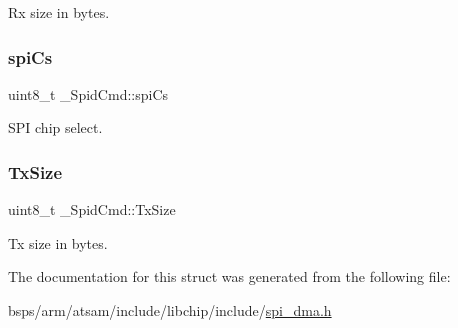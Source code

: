 Rx size in bytes. \mbox{\label{struct__SpidCmd_a25877429b448b90f258036306905bf7f}} 
\subsubsection{\texorpdfstring{spiCs}{spiCs}}
{\footnotesize\ttfamily uint8\+\_\+t \+\_\+\+Spid\+Cmd\+::spi\+Cs}

S\+PI chip select. \mbox{\label{struct__SpidCmd_ad23102062c57ef35dbbbf0feda93a655}} 
\subsubsection{\texorpdfstring{TxSize}{TxSize}}
{\footnotesize\ttfamily uint8\+\_\+t \+\_\+\+Spid\+Cmd\+::\+Tx\+Size}

Tx size in bytes. 

The documentation for this struct was generated from the following file\+:\begin{DoxyCompactItemize}
\item 
bsps/arm/atsam/include/libchip/include/\mbox{\hyperlink{spi__dma_8h}{spi\+\_\+dma.\+h}}\end{DoxyCompactItemize}
